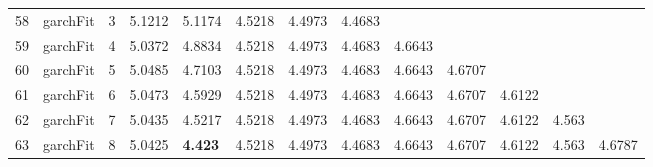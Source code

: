 \documentclass[10pt,a4paper]{article}
\begin{document}
\begin{table}[ht]
\begin{tabular}{rlrllllllllll}
  58 & garchFit &     3 & 5.1212 & 5.1174 & 4.5218 & 4.4973 & 4.4683 &  &  &  &  &  \\ 
  59 & garchFit &     4 & 5.0372 & 4.8834 & 4.5218 & 4.4973 & 4.4683 & 4.6643 &  &  &  &  \\ 
  60 & garchFit &     5 & 5.0485 & 4.7103 & 4.5218 & 4.4973 & 4.4683 & 4.6643 & 4.6707 &  &  &  \\ 
  61 & garchFit &     6 & 5.0473 & 4.5929 & 4.5218 & 4.4973 & 4.4683 & 4.6643 & 4.6707 & 4.6122 &  &  \\ 
  62 & garchFit &     7 & 5.0435 & 4.5217 & 4.5218 & 4.4973 & 4.4683 & 4.6643 & 4.6707 & 4.6122 & 4.563 &  \\ 
  63 & garchFit &     8 & 5.0425 & \textbf{4.423} & 4.5218 & 4.4973 & 4.4683 & 4.6643 & 4.6707 & 4.6122 & 4.563 & 4.6787 \\ 
   \hline
\end{tabular}
\end{table}
\end{document}
